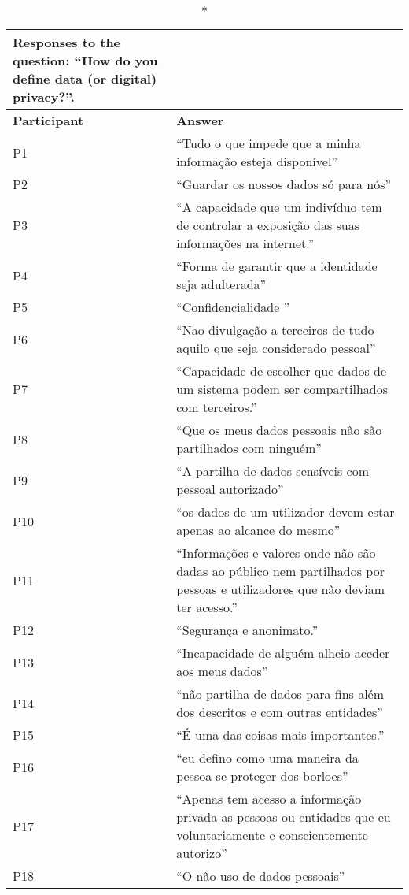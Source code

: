 \begin{longtable}{p{3cm} p{13cm}}
    \caption*{Responses to the question: ``How do you define data (or digital) privacy?''.}\label{table:survey_s1_q5}\\
    \hline
    \textbf{Participant} & \textbf{Answer} \\
    \hline
    P1 & ``Tudo o que impede que a minha informação esteja disponível'' \\
    \hline
    P2 & ``Guardar os nossos dados só para nós'' \\
    \hline
    P3 & ``A capacidade que um indivíduo tem de controlar a exposição das suas informações na internet.'' \\
    \hline
    P4 & ``Forma de garantir que a identidade seja adulterada'' \\
    \hline
    P5 & ``Confidencialidade '' \\
    \hline
    P6 & ``Nao divulgação a terceiros de tudo aquilo que seja considerado pessoal'' \\
    \hline
    P7 & ``Capacidade de escolher que dados de um sistema podem ser compartilhados com terceiros.'' \\
    \hline
    P8 & ``Que os meus dados pessoais não são partilhados com ninguém'' \\
    \hline
    P9 & ``A partilha de dados sensíveis com pessoal autorizado'' \\
    \hline
    P10 & ``os dados de um utilizador devem estar apenas ao alcance do mesmo'' \\
    \hline
    P11 & ``Informações e valores onde não são dadas ao público nem partilhados por pessoas e utilizadores que não deviam ter acesso.'' \\
    \hline
    P12 & ``Segurança e anonimato.'' \\
    \hline
    P13 & ``Incapacidade de alguém alheio aceder aos meus dados'' \\
    \hline
    P14 & ``não partilha de dados para fins além dos descritos e com outras entidades'' \\
    \hline
    P15 & ``É uma das coisas mais importantes.'' \\
    \hline
    P16 & ``eu defino  como  uma maneira da pessoa se proteger dos borloes'' \\
    \hline
    P17 & ``Apenas tem acesso a informação privada as pessoas ou entidades que eu voluntariamente e conscientemente autorizo'' \\
    \hline
    P18 & ``O não uso de dados pessoais'' \\

\end{longtable}
